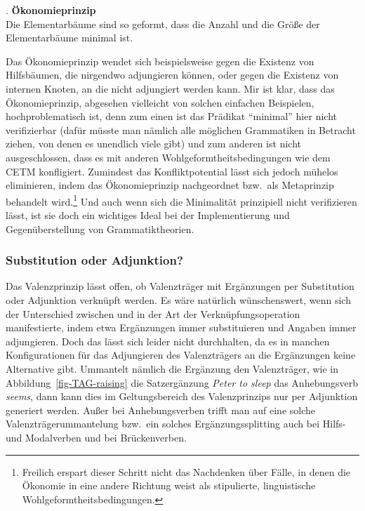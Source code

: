 \ex. {\bf Ökonomieprinzip}\label{ex-oekonomieprinzip-tag} \\
Die Elementarbäume sind so geformt, dass die Anzahl und die Grö\ss e der Elementarbäume minimal ist.     

Das Ökonomieprinzip wendet sich beispielsweise gegen die Existenz von Hilfsbäumen, die nirgendwo adjungieren können, oder gegen die Existenz von internen Knoten, an die nicht adjungiert werden kann. Mir ist klar, dass das Ökonomieprinzip, abgesehen vielleicht von solchen einfachen Beispielen, hochproblematisch ist, denn zum einen ist das Prädikat "`minimal"' hier nicht verifizierbar (dafür müsste man nämlich alle möglichen Grammatiken in Betracht ziehen, von denen es unendlich viele gibt) und zum anderen ist nicht ausgeschlossen, dass es mit anderen Wohlgeformtheitsbedingungen wie dem CETM konfligiert. Zumindest das Konfliktpotential lässt sich jedoch mühelos eliminieren, indem das Ökonomieprinzip nachgeordnet bzw.\ als Metaprinzip behandelt wird.\footnote{Freilich erspart dieser Schritt nicht das Nachdenken über Fälle, in denen die Ökonomie in eine andere Richtung weist als stipulierte, linguistische Wohlgeformtheitsbedingungen.} Und auch wenn sich die Minimalität prinzipiell nicht verifizieren lässt, ist sie doch ein wichtiges Ideal bei der Implementierung und Gegenüberstellung von Grammatiktheorien.     



\subsubsection*{Substitution oder Adjunktion?} \label{sec-ableitungsbaum}

Das Valenzprinzip lässt offen, ob Valenzträger mit Ergänzungen per Substitution oder Adjunktion verknüpft werden. Es wäre natürlich wünschenswert, wenn sich der Unterschied zwischen  und  in der Art der Verknüpfungsoperation manifestierte, indem etwa Ergänzungen immer substituieren und Angaben immer adjungieren. Doch das lässt sich leider nicht durchhalten, da es in manchen Konfigurationen für das Adjungieren des Valenzträgers an die Ergänzungen keine Alternative gibt. Ummantelt nämlich die Ergänzung den Valenzträger, wie in Abbildung~\ref{fig-TAG-raising} die Satzergänzung {\it Peter to sleep} das Anhebungsverb {\it seems}, dann kann dies im Geltungsbereich des Valenzprinzips nur per Adjunktion generiert werden. Au\ss er bei Anhebungsverben trifft man auf eine solche Valenzträgerummantelung bzw.\ ein solches Ergänzungssplitting auch bei Hilfs- und Modalverben und bei Brückenverben.

